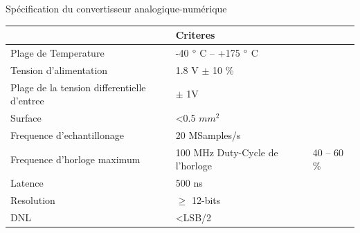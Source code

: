 \begin{mdframed}[linecolor=Prune,linewidth=1]
\begin{center}
    \centering
    \caption[]{Spécification du convertisseur analogique-numérique}
    \label{tbl:adc-spec-fr}
    \begin{tabular}{ll}
        \toprule
                                     & Criteres                                                                                                                                                   \\ \midrule
    Plage de Temperature            & -40 $\degree$ C -- +175 $\degree$ C                                                                                               \\
    Tension d'alimentation                   & 1.8 V $\pm$ 10 \%                                                                                                                              \\
    Plage de la tension differentielle d'entree & $\pm$ 1V                                                                                                                                       \\
    Surface                             & \textless 0.5 \(mm^2\)                                                                                                                                      \\
    Frequence d'echantillonage       & 20 MSamples/s                                                                                                                                               \\
    Frequence d'horloge maximum      & 100 MHz
    Duty-Cycle de l'horloge                & 40 -- 60 \%                                                                                                                                                 \\
    Latence                          & 500 ns                                                                                                                                                      \\
    Resolution                       & $\geq$ 12-bits                                                                                                                                     \\
    DNL                              & \textless LSB/2                                                                                                                                             \\

\end{tabular}
\end{center}
\end{mdframed}
